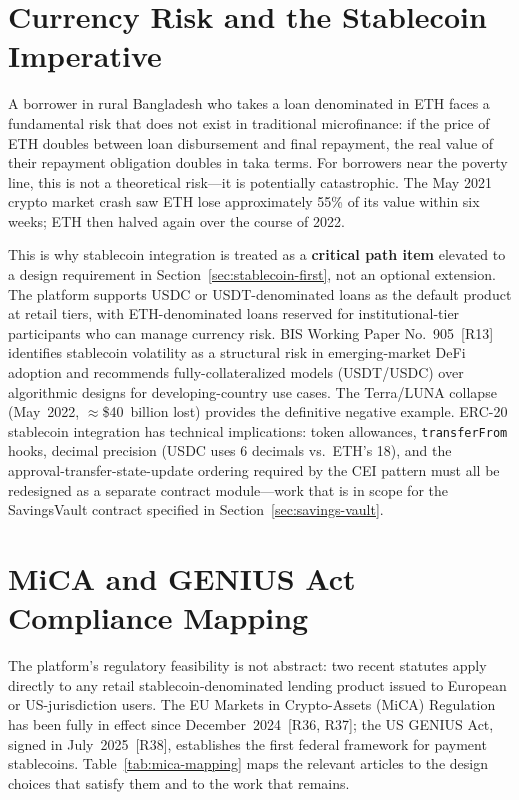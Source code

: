 \documentclass[12pt,a4paper]{report}
\begin{document}
\section{Currency Risk and the Stablecoin Imperative}

A borrower in rural Bangladesh who takes a loan denominated in ETH faces a fundamental risk that does not exist in traditional microfinance: if the price of ETH doubles between loan disbursement and final repayment, the real value of their repayment obligation doubles in taka terms. For borrowers near the poverty line, this is not a theoretical risk---it is potentially catastrophic. The May 2021 crypto market crash saw ETH lose approximately 55\% of its value within six weeks; ETH then halved again over the course of 2022.

This is why stablecoin integration is treated as a \textbf{critical path item} elevated to a design requirement in Section~\ref{sec:stablecoin-first}, not an optional extension. The platform supports USDC or USDT-denominated loans as the default product at retail tiers, with ETH-denominated loans reserved for institutional-tier participants who can manage currency risk. BIS Working Paper No.~905~[R13] identifies stablecoin volatility as a structural risk in emerging-market DeFi adoption and recommends fully-collateralized models (USDT/USDC) over algorithmic designs for developing-country use cases. The Terra/LUNA collapse (May~2022, $\approx$\$40~billion lost) provides the definitive negative example. ERC-20 stablecoin integration has technical implications: token allowances, \texttt{transferFrom} hooks, decimal precision (USDC uses 6 decimals vs.\ ETH's 18), and the approval-transfer-state-update ordering required by the CEI pattern must all be redesigned as a separate contract module---work that is in scope for the SavingsVault contract specified in Section~\ref{sec:savings-vault}.

\section{MiCA and GENIUS Act Compliance Mapping}
\label{sec:mica-compliance}

The platform's regulatory feasibility is not abstract: two recent statutes apply directly to any retail stablecoin-denominated lending product issued to European or US-jurisdiction users. The EU Markets in Crypto-Assets (MiCA) Regulation has been fully in effect since December~2024~[R36, R37]; the US GENIUS Act, signed in July~2025~[R38], establishes the first federal framework for payment stablecoins. Table~\ref{tab:mica-mapping} maps the relevant articles to the design choices that satisfy them and to the work that remains.
\end{document}
